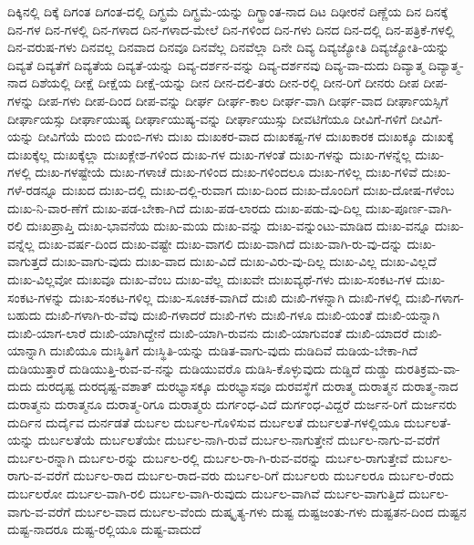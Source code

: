 {ದಿಕ್ಕಿನಲ್ಲಿ
ದಿಕ್ಕೆ
ದಿಗಂತ
ದಿಗಂತ-ದಲ್ಲಿ
ದಿಗ್ಭ್ರಮೆ
ದಿಗ್ಭ್ರಮೆ-ಯನ್ನು
ದಿಗ್ಭ್ರಾಂತ-ನಾದ
ದಿಟ
ದಿಢೀರನೆ
ದಿಣ್ಣೆಯ
ದಿನ
ದಿನಕ್ಕೆ
ದಿನ-ಗಳ
ದಿನ-ಗಳಲ್ಲಿ
ದಿನ-ಗಳಾದ
ದಿನ-ಗಳಾದ-ಮೇಲೆ
ದಿನ-ಗಳಿಂದ
ದಿನ-ಗಳು
ದಿನದ
ದಿನ-ದಲ್ಲಿ
ದಿನ-ಪತ್ರಿಕೆ-ಗಳಲ್ಲಿ
ದಿನ-ವರುಷ-ಗಳು
ದಿನವಲ್ಲ
ದಿನವಾದ
ದಿನವೂ
ದಿನವೆಲ್ಲ
ದಿನವೆಲ್ಲಾ
ದಿನೇ
ದಿವ್ಯ
ದಿವ್ಯಜ್ಯೋತಿ
ದಿವ್ಯಜ್ಯೋತಿ-ಯನ್ನು
ದಿವ್ಯತೆ
ದಿವ್ಯತೆಗೆ
ದಿವ್ಯತೆಯ
ದಿವ್ಯತೆ-ಯನ್ನು
ದಿವ್ಯ-ದರ್ಶನ-ವನ್ನು
ದಿವ್ಯ-ದರ್ಶನವು
ದಿವ್ಯ-ವಾ-ದುದು
ದಿವ್ಯಾತ್ಮ
ದಿವ್ಯಾತ್ಮ-ನಾದ
ದಿಶೆಯಲ್ಲಿ
ದೀಕ್ಷೆ
ದೀಕ್ಷೆಯ
ದೀಕ್ಷೆ-ಯನ್ನು
ದೀನ
ದೀನ-ದಲಿ-ತರು
ದೀನ-ರಲ್ಲಿ
ದೀನ-ರಿಗೆ
ದೀನರು
ದೀಪ
ದೀಪ-ಗಳನ್ನು
ದೀಪ-ಗಳು
ದೀಪ-ದಿಂದ
ದೀಪ-ವನ್ನು
ದೀರ್ಘ
ದೀರ್ಘ-ಕಾಲ
ದೀರ್ಘ-ವಾಗಿ
ದೀರ್ಘ-ವಾದ
ದೀರ್ಘಾಯಸ್ಸಿಗೆ
ದೀರ್ಘಾಯಸ್ಸು
ದೀರ್ಘಾಯುಷ್ಯ
ದೀರ್ಘಾಯುಷ್ಯ-ವನ್ನು
ದೀರ್ಘಾಯುಸ್ಸು
ದೀವಟಿಗೆಯೂ
ದೀವಿಗೆ-ಗಳಿಗೆ
ದೀವಿಗೆ-ಯನ್ನು
ದೀವಿಗೆಯೆ
ದುಂಬಿ
ದುಂಬಿ-ಗಳು
ದುಃಖ
ದುಃಖಕರ-ವಾದ
ದುಃಖಕಷ್ಟ-ಗಳ
ದುಃಖಕಾರಕ
ದುಃಖಕ್ಕೂ
ದುಃಖಕ್ಕೆ
ದುಃಖಕ್ಕೆಲ್ಲ
ದುಃಖಕ್ಕೆಲ್ಲಾ
ದುಃಖಕ್ಲೇಶ-ಗಳಿಂದ
ದುಃಖ-ಗಳ
ದುಃಖ-ಗಳಂತೆ
ದುಃಖ-ಗಳನ್ನು
ದುಃಖ-ಗಳನ್ನೆಲ್ಲ
ದುಃಖ-ಗಳಲ್ಲಿ
ದುಃಖ-ಗಳಷ್ಟೇಯೆ
ದುಃಖ-ಗಳಾಚೆ
ದುಃಖ-ಗಳಿಂದ
ದುಃಖ-ಗಳಿಂದಲೂ
ದುಃಖ-ಗಳಿಲ್ಲ
ದುಃಖ-ಗಳಿವೆ
ದುಃಖ-ಗಳೆ-ರಡನ್ನೂ
ದುಃಖದ
ದುಃಖ-ದಲ್ಲಿ
ದುಃಖ-ದಲ್ಲಿ-ರುವಾಗ
ದುಃಖ-ದಿಂದ
ದುಃಖ-ದೊಂದಿಗೆ
ದುಃಖ-ದೋಷ-ಗಳೆಂಬ
ದುಃಖ-ನಿ-ವಾರ-ಣೆಗೆ
ದುಃಖ-ಪಡ-ಬೇಕಾ-ಗಿದೆ
ದುಃಖ-ಪಡ-ಲಾರದು
ದುಃಖ-ಪಡು-ವು-ದಿಲ್ಲ
ದುಃಖ-ಪೂರ್ಣ-ವಾಗಿ-ರಲಿ
ದುಃಖಪ್ರಾಪ್ತಿ
ದುಃಖ-ಭಾವನೆಯ
ದುಃಖ-ಮಯ
ದುಃಖ-ವನ್ನು
ದುಃಖ-ವನ್ನುಂಟು-ಮಾಡಿದ
ದುಃಖ-ವನ್ನೂ
ದುಃಖ-ವನ್ನೆಲ್ಲ
ದುಃಖ-ವರ್ಷ-ದಿಂದ
ದುಃಖ-ವಷ್ಟೇ
ದುಃಖ-ವಾಗಲಿ
ದುಃಖ-ವಾಗಿದೆ
ದುಃಖ-ವಾಗಿ-ರು-ವು-ದನ್ನು
ದುಃಖ-ವಾಗುತ್ತದೆ
ದುಃಖ-ವಾಗು-ವುದು
ದುಃಖ-ವಾದ
ದುಃಖ-ವಿದೆ
ದುಃಖ-ವಿರು-ವು-ದಿಲ್ಲ
ದುಃಖ-ವಿಲ್ಲ
ದುಃಖ-ವಿಲ್ಲದೆ
ದುಃಖ-ವಿಲ್ಲವೋ
ದುಃಖವೂ
ದುಃಖ-ವೆಂಬ
ದುಃಖ-ವೆಲ್ಲ
ದುಃಖವೇ
ದುಃಖವ್ಯಥೆ-ಗಳು
ದುಃಖ-ಸಂಕಟ-ಗಳ
ದುಃಖ-ಸಂಕಟ-ಗಳನ್ನು
ದುಃಖ-ಸಂಕಟ-ಗಳಿಲ್ಲ
ದುಃಖ-ಸೂಚಕ-ವಾಗಿದೆ
ದುಃಖಿ
ದುಃಖಿ-ಗಳನ್ನಾಗಿ
ದುಃಖಿ-ಗಳಲ್ಲಿ
ದುಃಖಿ-ಗಳಾಗ-ಬಹುದು
ದುಃಖಿ-ಗಳಾಗಿ-ರು-ವೆವು
ದುಃಖಿ-ಗಳಾದರೆ
ದುಃಖಿ-ಗಳು
ದುಃಖಿ-ಗಳೂ
ದುಃಖಿ-ಯಂತೆ
ದುಃಖಿ-ಯನ್ನಾಗಿ
ದುಃಖಿ-ಯಾಗ-ಲಾರೆ
ದುಃಖಿ-ಯಾಗಿದ್ದೇನೆ
ದುಃಖಿ-ಯಾಗಿ-ರುವನು
ದುಃಖಿ-ಯಾಗುವಂತೆ
ದುಃಖಿ-ಯಾದರೆ
ದುಃಖಿ-ಯಾನ್ನಾಗಿ
ದುಃಖಿಯೂ
ದುಃಸ್ಥಿತಿಗೆ
ದುಃಸ್ಥಿತಿ-ಯನ್ನು
ದುಡಿತ-ವಾಗು-ವುದು
ದುಡಿದಿವೆ
ದುಡಿಯ-ಬೇಕಾ-ಗಿದೆ
ದುಡಿಯುತ್ತಾರೆ
ದುಡಿಯುತ್ತಿ-ರುವ-ವ-ನನ್ನು
ದುಡಿಯುವರೊ
ದುಡಿಸಿ-ಕೊಳ್ಳುವುದು
ದುಡ್ಡಿದೆ
ದುಡ್ಡು
ದುರತಿಕ್ರಮ-ವಾ-ದುದು
ದುರದೃಷ್ಟ
ದುರದೃಷ್ಟ-ವಶಾತ್
ದುರಭ್ಯಾಸಕ್ಕೂ
ದುರಭ್ಯಾಸವೂ
ದುರವಸ್ಥೆಗೆ
ದುರಾತ್ಮ
ದುರಾತ್ಮನ
ದುರಾತ್ಮ-ನಾದ
ದುರಾತ್ಮನು
ದುರಾತ್ಮನೂ
ದುರಾತ್ಮ-ರಿಗೂ
ದುರಾತ್ಮರು
ದುರ್ಗಂಧ-ವಿದೆ
ದುರ್ಗಂಧ-ವಿದ್ದರೆ
ದುರ್ಜನ-ರಿಗೆ
ದುರ್ಜನರು
ದುರ್ದಿನ
ದುರ್ದೈವ
ದುರ್ನಡತೆ
ದುರ್ಬಲ
ದುರ್ಬಲ-ಗೊಳಿಸುವ
ದುರ್ಬಲತೆ
ದುರ್ಬಲತೆ-ಗಳಲ್ಲಿಯೂ
ದುರ್ಬಲತೆ-ಯನ್ನು
ದುರ್ಬಲತೆಯೆ
ದುರ್ಬಲತೆಯೇ
ದುರ್ಬಲ-ನಾಗಿ-ರುವೆ
ದುರ್ಬಲ-ನಾಗುತ್ತೇನೆ
ದುರ್ಬಲ-ನಾಗು-ವ-ವರೆಗೆ
ದುರ್ಬಲ-ರನ್ನಾಗಿ
ದುರ್ಬಲ-ರನ್ನು
ದುರ್ಬಲ-ರಲ್ಲಿ
ದುರ್ಬಲ-ರಾ-ಗಿ-ರುವ-ವರನ್ನು
ದುರ್ಬಲ-ರಾಗುತ್ತೇವೆ
ದುರ್ಬಲ-ರಾಗು-ವ-ವರೆಗೆ
ದುರ್ಬಲ-ರಾದ
ದುರ್ಬಲ-ರಾದ-ವರು
ದುರ್ಬಲ-ರಿಗೆ
ದುರ್ಬಲರು
ದುರ್ಬಲರೂ
ದುರ್ಬಲ-ರೆಂದು
ದುರ್ಬಲರೋ
ದುರ್ಬಲ-ವಾಗಿ-ರಲಿ
ದುರ್ಬಲ-ವಾಗಿ-ರುವುದು
ದುರ್ಬಲ-ವಾಗಿವೆ
ದುರ್ಬಲ-ವಾಗುತ್ತಿದೆ
ದುರ್ಬಲ-ವಾಗು-ವ-ವರೆಗೆ
ದುರ್ಬಲ-ವಾದ
ದುರ್ಬಲ-ವೆಂದು
ದುಷ್ಕೃತ್ಯ-ಗಳು
ದುಷ್ಟ
ದುಷ್ಟಜಂತು-ಗಳು
ದುಷ್ಟತನ-ದಿಂದ
ದುಷ್ಟನ
ದುಷ್ಟ-ನಾದರೂ
ದುಷ್ಟ-ರಲ್ಲಿಯೂ
ದುಷ್ಟ-ವಾದುದೆ
}
